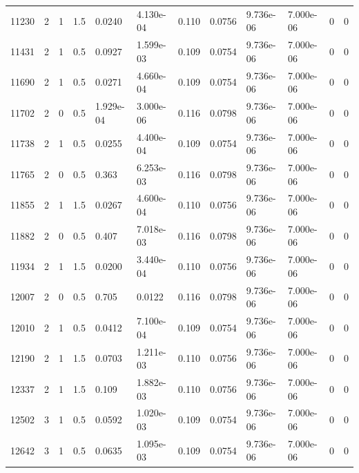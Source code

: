 \documentclass[preview]{standalone}
\begin{document}
{{{\begin{tabular}{L{1.2cm}C{1.2cm} C{0.3cm}C{0.5cm} C{1.4cm}C{1.4cm} C{1.4cm}C{1.4cm} C{1.6cm}C{1.6cm} C{1.6cm}C{1.6cm}}
  11230  &     2  & 1     & 1.5 &  0.0240  & 4.130e-04  &  0.110&   0.0756& 9.736e-06 & 7.000e-06   &  0 & 0  \\ 
  11431  &     2  & 1     & 0.5 &  0.0927  & 1.599e-03  &  0.109&   0.0754& 9.736e-06 & 7.000e-06   &  0 & 0  \\ 
  11690  &     2  & 1     & 0.5 &  0.0271  & 4.660e-04  &  0.109&   0.0754& 9.736e-06 & 7.000e-06   &  0 & 0  \\ 
  11702  &     2  & 0     & 0.5 &  1.929e-04  & 3.000e-06  &  0.116&   0.0798& 9.736e-06 & 7.000e-06   &  0 & 0  \\ 
  11738  &     2  & 1     & 0.5 &  0.0255  & 4.400e-04  &  0.109&   0.0754& 9.736e-06 & 7.000e-06   &  0 & 0  \\ 
  11765  &     2  & 0     & 0.5 &  0.363  & 6.253e-03  &  0.116&   0.0798& 9.736e-06 & 7.000e-06   &  0 & 0  \\ 
  11855  &     2  & 1     & 1.5 &  0.0267  & 4.600e-04  &  0.110&   0.0756& 9.736e-06 & 7.000e-06   &  0 & 0  \\ 
  11882  &     2  & 0     & 0.5 &  0.407  & 7.018e-03  &  0.116&   0.0798& 9.736e-06 & 7.000e-06   &  0 & 0  \\ 
  11934  &     2  & 1     & 1.5 &  0.0200  & 3.440e-04  &  0.110&   0.0756& 9.736e-06 & 7.000e-06   &  0 & 0  \\ 
  12007  &     2  & 0     & 0.5 &  0.705  & 0.0122  &  0.116&   0.0798& 9.736e-06 & 7.000e-06   &  0 & 0  \\ 
  12010  &     2  & 1     & 0.5 &  0.0412  & 7.100e-04  &  0.109&   0.0754& 9.736e-06 & 7.000e-06   &  0 & 0  \\ 
  12190  &     2  & 1     & 1.5 &  0.0703  & 1.211e-03  &  0.110&   0.0756& 9.736e-06 & 7.000e-06   &  0 & 0  \\ 
  12337  &     2  & 1     & 1.5 &  0.109  & 1.882e-03  &  0.110&   0.0756& 9.736e-06 & 7.000e-06   &  0 & 0  \\ 
  12502  &     3  & 1     & 0.5 &  0.0592  & 1.020e-03  &  0.109&   0.0754& 9.736e-06 & 7.000e-06   &  0 & 0  \\ 
  12642  &     3  & 1     & 0.5 &  0.0635  & 1.095e-03  &  0.109&   0.0754& 9.736e-06 & 7.000e-06   &  0 & 0  \\ 
\hline 
\end{tabular} 

}}}
\end{document}
